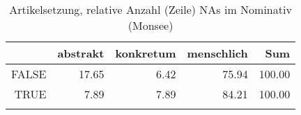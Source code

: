 \begin{table}[ht]
\centering
\begin{tabular}{rrrrr}
  \lsptoprule
 & abstrakt & konkretum & menschlich & Sum \\ 
  \midrule
FALSE & 17.65 & 6.42 & 75.94 & 100.00 \\ 
  TRUE & 7.89 & 7.89 & 84.21 & 100.00 \\ 
   \lspbottomrule
\end{tabular}
\caption{Artikelsetzung, relative Anzahl (Zeile) NAs im Nominativ (Monsee)} 
\end{table}
